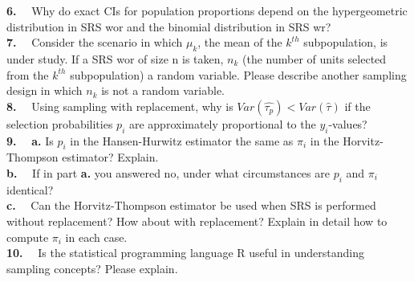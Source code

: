 {\bf 6.} \ \ Why do exact CIs for population proportions depend on the hypergeometric distribution in SRS wor and the binomial distribution in SRS wr? \\

{\bf 7.} \ \ Consider the scenario in which $\mu_k$, the mean of the $k^{th}$ subpopulation,
is under study.  If a SRS wor of size n is taken, $n_k$ (the number of units selected
from the $k^{th}$ subpopulation) a random variable.  Please describe another sampling design in which $n_k$ is not a random variable. \\

{\bf 8.} \ \ Using sampling with replacement, why is $Var(\widehat{\tau_p}) < Var(\widehat{\tau})$ if the selection probabilities $p_i$ are approximately proportional to the $y_i$-values? \\

{\bf 9.} \ \ {\bf a.} Is $p_i$ in the Hansen-Hurwitz estimator the same as $\pi_i$ in the Horvitz-Thompson estimator?  Explain.  \\
{\bf b.} \ \  If in part {\bf a.} you answered no, under what
circumstances are $p_i$ and $\pi_i$ identical? \\
{\bf c.} \ \ Can the Horvitz-Thompson estimator be used when SRS is performed without replacement? How about with replacement?  Explain in detail how to compute $\pi_i$ in each case. \\

{\bf 10.} \ \ Is the statistical programming language R useful in understanding sampling concepts?  Please explain. 

                                                                                                                                                        
